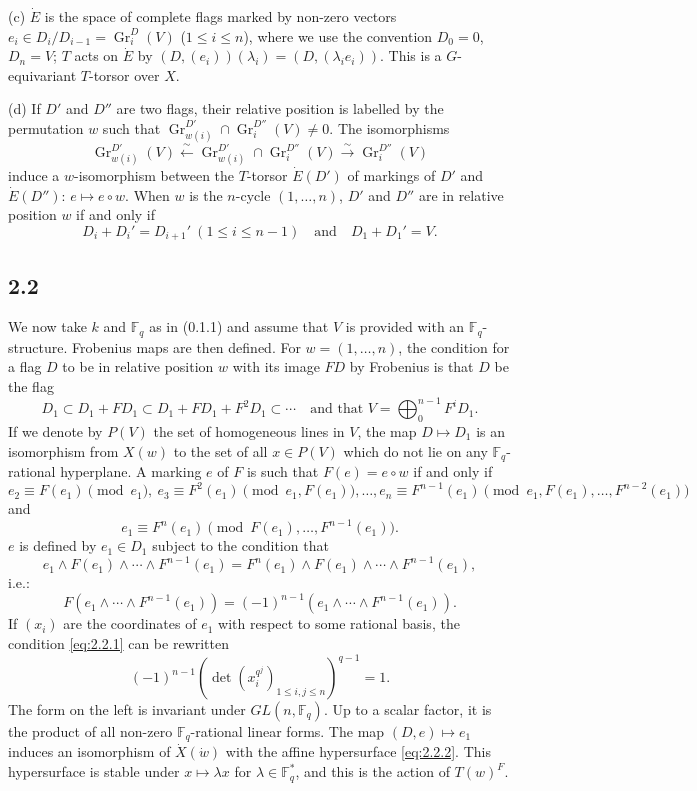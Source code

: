 \documentclass[11pt]{amsart}
\theoremstyle{plain}
\theoremstyle{remark}
\DeclareMathOperator{\Gr}{Gr}
\begin{document}
(c) $\dot{E}$ is the space of complete flags marked by non-zero vectors $e_i \in D_i/D_{i-1} = \Gr_i^D(V)$ ($1 \le i \le n$), where we use the convention $D_0 = 0$, $D_n = V$; $T$ acts on $\dot{E}$ by $(D, (e_i))(\lambda_i) = (D, (\lambda_i e_i))$. This is a $G$-equivariant $T$-torsor over $X$.

(d) If $D'$ and $D''$ are two flags, their relative position is labelled by the permutation $w$ such that $\Gr_{w(i)}^{D'} \cap \Gr_i^{D''}(V) \neq 0$. The isomorphisms
\[
\Gr_{w(i)}^{D'}(V) \xleftarrow{\sim} \Gr_{w(i)}^{D'} \cap \Gr_i^{D''}(V) \xrightarrow{\sim} \Gr_i^{D''}(V)
\]
induce a $w$-isomorphism between the $T$-torsor $\dot{E}(D')$ of markings of $D'$ and $\dot{E}(D'')$: $e \mapsto e \circ w$. When $w$ is the $n$-cycle $(1, \dots, n)$, $D'$ and $D''$ are in relative position $w$ if and only if
\[
D_i + D_i' = D_{i+1}' \ (1 \le i \le n-1) \quad \text{and} \quad D_1 + D_1' = V.
\]

\subsection{2.2} We now take $k$ and $\mathbb{F}_q$ as in (0.1.1) and assume that $V$ is provided with an $\mathbb{F}_q$-structure. Frobenius maps are then defined. For $w = (1, \dots, n)$, the condition for a flag $D$ to be in relative position $w$ with its image $FD$ by Frobenius is that $D$ be the flag
\[
D_1 \subset D_1 + FD_1 \subset D_1 + FD_1 + F^2D_1 \subset \cdots \quad \text{and that } V = \bigoplus_0^{n-1} F^i D_1.
\]
If we denote by $P(V)$ the set of homogeneous lines in $V$, the map $D \mapsto D_1$ is an isomorphism from $X(w)$ to the set of all $x \in P(V)$ which do not lie on any $\mathbb{F}_q$-rational hyperplane. A marking $e$ of $F$ is such that $F(e) = e \circ w$ if and only if
\[
e_2 \equiv F(e_1) \pmod{e_1}, \ e_3 \equiv F^2(e_1) \pmod{e_1, F(e_1)}, \dots, e_n \equiv F^{n-1}(e_1) \pmod{e_1, F(e_1), \dots, F^{n-2}(e_1)}
\]
and
\[
e_1 \equiv F^n(e_1) \pmod{F(e_1), \dots, F^{n-1}(e_1)}.
\]
$e$ is defined by $e_1 \in D_1$ subject to the condition that
\[
e_1 \wedge F(e_1) \wedge \cdots \wedge F^{n-1}(e_1) = F^n(e_1) \wedge F(e_1) \wedge \cdots \wedge F^{n-1}(e_1),
\]
i.e.:
\begin{equation}\label{eq:2.2.1}
F(e_1 \wedge \cdots \wedge F^{n-1}(e_1)) = (-1)^{n-1}(e_1 \wedge \cdots \wedge F^{n-1}(e_1)).
\end{equation}
If $(x_i)$ are the coordinates of $e_1$ with respect to some rational basis, the condition \eqref{eq:2.2.1} can be rewritten
\begin{equation}\label{eq:2.2.2}
(-1)^{n-1}(\det(x_i^{q^j})_{1 \le i,j \le n})^{q-1} = 1.
\end{equation}
The form on the left is invariant under $GL(n, \mathbb{F}_q)$. Up to a scalar factor, it is the product of all non-zero $\mathbb{F}_q$-rational linear forms. The map $(D, e) \mapsto e_1$ induces an isomorphism of $\dot{X}(\dot{w})$ with the affine hypersurface \eqref{eq:2.2.2}. This hypersurface is stable under $x \mapsto \lambda x$ for $\lambda \in \mathbb{F}_q^*$, and this is the action of $T(w)^F$.
\end{document}
